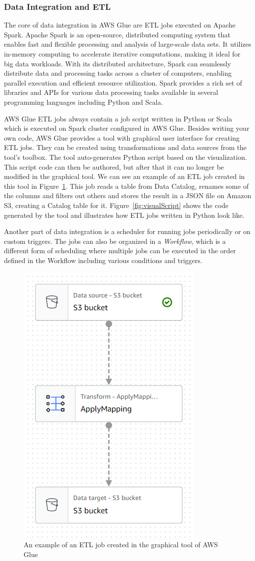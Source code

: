 \subsubsection{Data Integration and ETL}
The core of data integration in AWS Glue are ETL jobs executed on Apache Spark. Apache Spark is an open-source, distributed computing system that enables fast and flexible processing and analysis of large-scale data sets. It utilizes in-memory computing to accelerate iterative computations, making it ideal for big data workloads. With its distributed architecture, Spark can seamlessly distribute data and processing tasks across a cluster of computers, enabling parallel execution and efficient resource utilization. Spark provides a rich set of libraries and APIs for various data processing tasks available in several programming languages including Python and Scala.
\par
AWS Glue ETL jobs always contain a job script written in Python or Scala which is executed on Spark cluster configured in AWS Glue. Besides writing your own code, AWS Glue provides a tool with graphical user interface for creating ETL jobs. They can be created using transformations and data sources from the tool's toolbox. The tool auto-generates Python script based on the visualization. This script code can then be authored, but after that it can no longer be modified in the graphical tool.
We can see an example of an ETL job created in this tool in Figure~\ref{fig:visualJob}. This job reads a table from Data Catalog, renames some of the columns and filters out others and stores the result in a JSON file on Amazon S3, creating a Catalog table for it. Figure~\ref{fig:visualScript} shows the code generated by the tool and illustrates how ETL jobs written in Python look like.
\par
Another part of data integration is a scheduler for running jobs periodically or on custom triggers. The jobs can also be organized in a \textit{Workflow}, which is a different form of scheduling where multiple jobs can be executed in the order defined in the Workflow including various conditions and triggers.

\begin{figure}[ht]\centering
\includegraphics[height=0.6\textwidth]{img/job_example_visualization.png}
\caption{An example of an ETL job created in the graphical tool of AWS Glue}
\label{fig:visualJob}
\end{figure}

